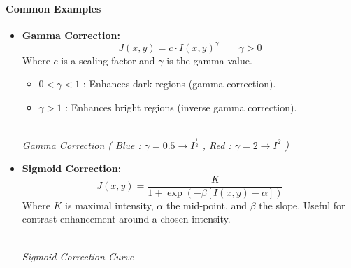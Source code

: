\paragraph{Common Examples}
\begin{itemize}
    
    \item \textbf{Gamma Correction:}
        $$
        J(x, y) = c \cdot I(x, y)^\gamma \qquad \gamma > 0
        $$
        Where $c$ is a scaling factor and $\gamma$ is the gamma value.
        \begin{itemize}
            \item $0 < \gamma < 1$ : Enhances dark regions (gamma correction).
            \item $\gamma > 1$ : Enhances bright regions (inverse gamma correction).
        \end{itemize}

        \begin{center}
        \\
        \emph{Gamma Correction ( Blue : $\gamma = 0.5 \rightarrow I^{\frac{1}{2}}$  , Red : $\gamma = 2 \rightarrow I^{2}$ )}
        \end{center}

    \item \textbf{Sigmoid Correction:}
        $$
        J(x, y) = \frac{K}{1 + \exp(-\beta [I(x, y) - \alpha])}
        $$
        Where $K$ is maximal intensity, $\alpha$ the mid-point, and $\beta$ the slope. Useful for contrast enhancement around a chosen intensity.

        \begin{center}
        \\
        \emph{Sigmoid Correction Curve}
        \end{center}



\end{itemize}
